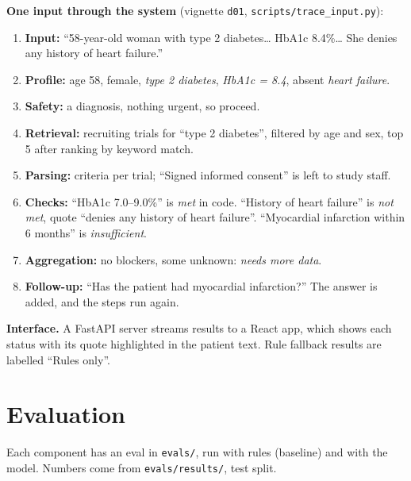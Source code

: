 \documentclass[11pt,a4paper]{article}
\begin{document}
\textbf{One input through the system} (vignette \texttt{d01}, \texttt{scripts/trace\_input.py}):
\begin{enumerate}
  \item \textbf{Input:} ``58-year-old woman with type 2 diabetes\ldots{} HbA1c 8.4\%\ldots{} She denies any history of heart failure.''
  \item \textbf{Profile:} age 58, female, \emph{type 2 diabetes}, \emph{HbA1c = 8.4}, absent \emph{heart failure}.
  \item \textbf{Safety:} a diagnosis, nothing urgent, so proceed.
  \item \textbf{Retrieval:} recruiting trials for ``type 2 diabetes'', filtered by age and sex, top 5 after ranking by keyword match.
  \item \textbf{Parsing:} criteria per trial; ``Signed informed consent'' is left to study staff.
  \item \textbf{Checks:} ``HbA1c 7.0--9.0\%'' is \emph{met} in code. ``History of heart failure'' is \emph{not met}, quote ``denies any history of heart failure''. ``Myocardial infarction within 6 months'' is \emph{insufficient}.
  \item \textbf{Aggregation:} no blockers, some unknown: \emph{needs more data}.
  \item \textbf{Follow-up:} ``Has the patient had myocardial infarction?'' The answer is added, and the steps run again.
\end{enumerate}

\textbf{Interface.} A FastAPI server streams results to a React app, which shows each status with its quote highlighted in the patient text. Rule fallback results are labelled ``Rules only''.

\section{Evaluation}

Each component has an eval in \texttt{evals/}, run with rules (baseline) and with the model. Numbers come from \texttt{evals/results/}, test split.
\end{document}
